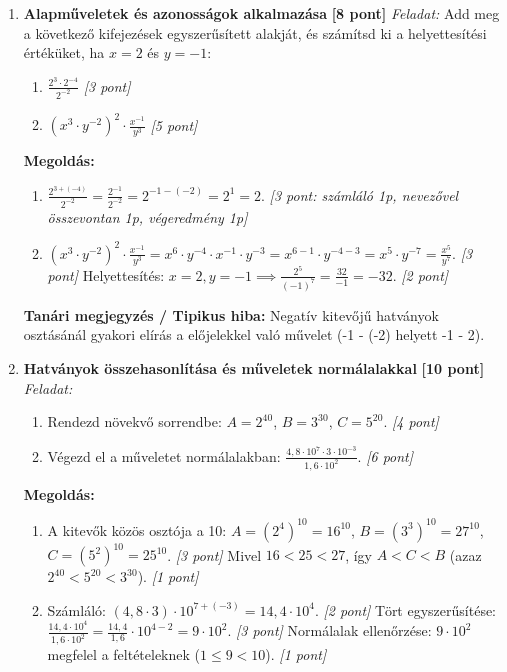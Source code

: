 \documentclass[a4paper,11pt]{article}
\begin{document}
\begin{enumerate}
  \item \textbf{Alapműveletek és azonosságok alkalmazása} \hfill \textbf{[8 pont]}
  \textit{Feladat:} Add meg a következő kifejezések egyszerűsített alakját, és számítsd ki a helyettesítési értéküket, ha $x = 2$ és $y = -1$:
  \begin{enumerate}
    \item $\frac{2^3 \cdot 2^{-4}}{2^{-2}}$ \hfill \textit{[3 pont]}
    \item $(x^3 \cdot y^{-2})^2 \cdot \frac{x^{-1}}{y^3}$ \hfill \textit{[5 pont]}
  \end{enumerate}
  
  \textbf{Megoldás:}
  \begin{enumerate}
    \item $\frac{2^{3+(-4)}}{2^{-2}} = \frac{2^{-1}}{2^{-2}} = 2^{-1 - (-2)} = 2^1 = 2$. \hfill \textit{[3 pont: számláló 1p, nevezővel összevontan 1p, végeredmény 1p]}
    \item $(x^3 \cdot y^{-2})^2 \cdot \frac{x^{-1}}{y^3} = x^6 \cdot y^{-4} \cdot x^{-1} \cdot y^{-3} = x^{6-1} \cdot y^{-4-3} = x^5 \cdot y^{-7} = \frac{x^5}{y^7}$. \hfill \textit{[3 pont]}
    Helyettesítés: $x=2, y=-1 \implies \frac{2^5}{(-1)^7} = \frac{32}{-1} = -32$. \hfill \textit{[2 pont]}
  \end{enumerate}
  \textbf{Tanári megjegyzés / Tipikus hiba:} Negatív kitevőjű hatványok osztásánál gyakori elírás a előjelekkel való művelet (-1 - (-2) helyett -1 - 2).

  \item \textbf{Hatványok összehasonlítása és műveletek normálalakkal} \hfill \textbf{[10 pont]}
  \textit{Feladat:} 
  \begin{enumerate}
    \item Rendezd növekvő sorrendbe: $A = 2^{40}$, $B = 3^{30}$, $C = 5^{20}$. \hfill \textit{[4 pont]}
    \item Végezd el a műveletet normálalakban: $\frac{4,8 \cdot 10^7 \cdot 3 \cdot 10^{-3}}{1,6 \cdot 10^2}$. \hfill \textit{[6 pont]}
  \end{enumerate}

  \textbf{Megoldás:}
  \begin{enumerate}
    \item A kitevők közös osztója a 10: $A = (2^4)^{10} = 16^{10}$, $B = (3^3)^{10} = 27^{10}$, $C = (5^2)^{10} = 25^{10}$. \hfill \textit{[3 pont]}
    Mivel $16 < 25 < 27$, így $A < C < B$ (azaz $2^{40} < 5^{20} < 3^{30}$). \hfill \textit{[1 pont]}
    \item Számláló: $(4,8 \cdot 3) \cdot 10^{7+(-3)} = 14,4 \cdot 10^4$. \hfill \textit{[2 pont]}
    Tört egyszerűsítése: $\frac{14,4 \cdot 10^4}{1,6 \cdot 10^2} = \frac{14,4}{1,6} \cdot 10^{4-2} = 9 \cdot 10^2$. \hfill \textit{[3 pont]}
    Normálalak ellenőrzése: $9 \cdot 10^2$ megfelel a feltételeknek ($1 \le 9 < 10$). \hfill \textit{[1 pont]}
  \end{enumerate}


\end{enumerate}
\end{document}
